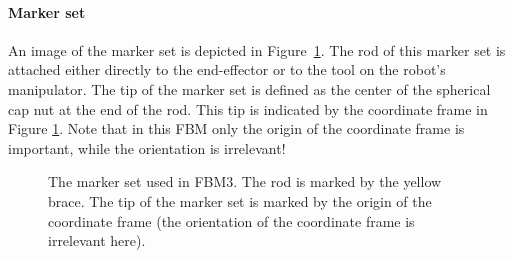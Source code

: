 \paragraph{Marker set}
An image of the marker set is depicted in Figure~\ref{fig:MarkerSetEndEffector}. The rod of this marker set is attached either directly to the end-effector or to the tool on the robot's manipulator. The tip of the marker set is defined as the center of the spherical cap nut at the end of the rod. This tip is indicated by the coordinate frame in Figure \ref{fig:MarkerSetEndEffector}. Note that in this FBM only the origin of the coordinate frame is important, while the orientation is irrelevant!
\begin{figure}[!htbp]
	\begin{center}
		\caption{The marker set used in FBM3. The rod is marked by the yellow brace. The tip of the marker set is marked by the origin of the coordinate frame (the orientation of the coordinate frame is irrelevant here).}
		\label{fig:MarkerSetEndEffector}
	\end{center}
\end{figure}

